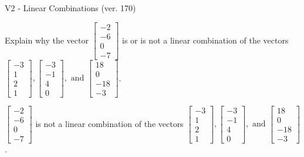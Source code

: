 \begin{exercise}
  \begin{exerciseTitle}V2 - Linear Combinations (ver. 170)\end{exerciseTitle}
  \begin{exerciseStatement}
    Explain why the vector \(\left[\begin{array}{c}
-2 \\
-6 \\
0 \\
-7
\end{array}\right]\)  is or is not a linear 
	combination of the vectors \(\left[\begin{array}{c}
-3 \\
1 \\
2 \\
1
\end{array}\right] , \left[\begin{array}{c}
-3 \\
-1 \\
4 \\
0
\end{array}\right] , \text{ and } \left[\begin{array}{c}
18 \\
0 \\
-18 \\
-3
\end{array}\right]\).
	


  \end{exerciseStatement}
  \begin{exerciseAnswer}
   \(\left[\begin{array}{c}
-2 \\
-6 \\
0 \\
-7
\end{array}\right]\) 
  	 is not  
	a linear combination of the vectors \(\left[\begin{array}{c}
-3 \\
1 \\
2 \\
1
\end{array}\right] , \left[\begin{array}{c}
-3 \\
-1 \\
4 \\
0
\end{array}\right] , \text{ and } \left[\begin{array}{c}
18 \\
0 \\
-18 \\
-3
\end{array}\right]\).

	
  


  \end{exerciseAnswer}
\end{exercise}
